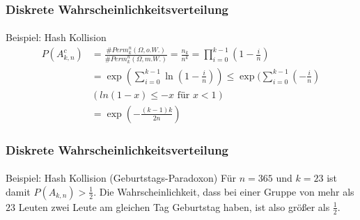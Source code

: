 \documentclass{beamer}
\begin{document}
\begin{frame}
    \frametitle{Diskrete Wahrscheinlichkeitsverteilung}
\framesubtitle{}

\begin{block}{Beispiel: Hash Kollision}
\begin{align*}
 P(A^c_{k,n} ) & = \frac{\# Perm^n_k(\Omega, o.W.)}{ \# Perm^n_k(\Omega, m.W.)} = \frac{n_k}{n^k} = \prod_{i=0}^{k-1} (1- \frac{i}{n}) \\
& = \exp (\sum_{i=0}^{k-1} \ln {(1- \frac{i}{n})}) \leq  \exp (\sum_{i=0}^{k-1} (- \frac{i}{n}) \\
 & (ln(1-x) \leq -x \text{ für } x < 1) \\
&= \exp(- \frac{(k-1)k } {2n})
\end{align*}
\end{block}



 \end{frame}

\begin{frame}
    \frametitle{Diskrete Wahrscheinlichkeitsverteilung}
\framesubtitle{}

\begin{block}{Beispiel: Hash Kollision (Geburtstags-Paradoxon)}
Für $n=365$ und $k=23$ ist damit $ P(A_{k,n} ) > \frac{1}{2}$. Die Wahrscheinlichkeit, dass bei einer Gruppe von mehr als $23$ Leuten zwei Leute am gleichen Tag Geburtstag haben, ist also größer als $ \frac{1}{2}$.
\end{block}



 \end{frame}
\end{document}
